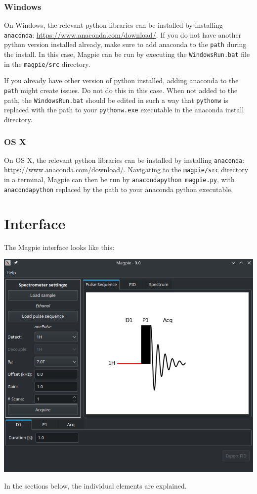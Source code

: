 \documentclass[11pt,a4paper]{article}
\begin{document}
\subsubsection{Windows}
On Windows, the relevant python libraries can be installed by installing \texttt{anaconda}:
\url{https://www.anaconda.com/download/}. If you do not have another python version installed
already, make sure to add anaconda to the \texttt{path} during the install. In this case, Magpie can
be run by executing the \texttt{WindowsRun.bat} file in the \texttt{magpie/src} directory. %

If you already have other version of python installed, adding anaconda to the \texttt{path} might
create issues. Do not do this in this case. When not added to the path, the \texttt{WindowsRun.bat}
should be edited in such a way that \texttt{pythonw} is replaced with the path to your
\texttt{pythonw.exe} executable in the anaconda install directory.

\subsubsection{OS X}
On OS X, the relevant python libraries can be installed by installing \texttt{anaconda}:
\url{https://www.anaconda.com/download/}. Navigating to the \texttt{magpie/src} directory in a terminal, Magpie can then be run
by \texttt{anacondapython magpie.py}, with \texttt{anacondapython} replaced by the path to your
anaconda python executable.


\section{Interface}

The Magpie interface looks like this:
\begin{center}
\includegraphics[width=0.7\linewidth]{images/Full_interface.png}
\end{center}
In the sections below, the individual elements are explained.
\end{document}

